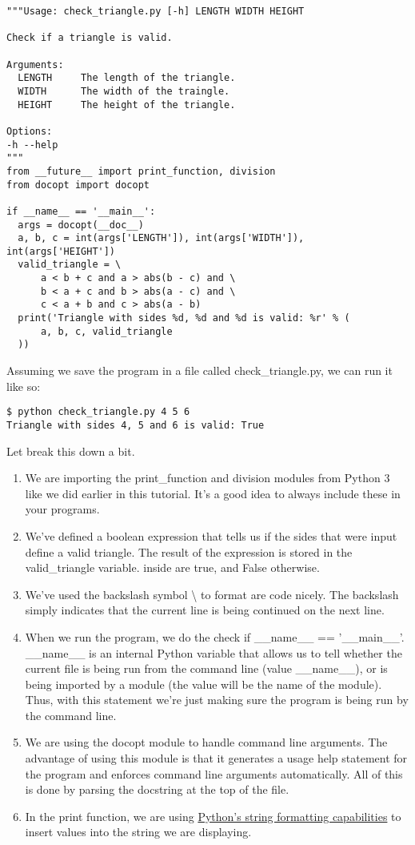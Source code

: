 \begin{verbatim}
"""Usage: check_triangle.py [-h] LENGTH WIDTH HEIGHT

Check if a triangle is valid.

Arguments:
  LENGTH     The length of the triangle.
  WIDTH      The width of the traingle.
  HEIGHT     The height of the triangle.

Options:
-h --help
"""
from __future__ import print_function, division
from docopt import docopt

if __name__ == '__main__':
  args = docopt(__doc__)
  a, b, c = int(args['LENGTH']), int(args['WIDTH']), int(args['HEIGHT'])
  valid_triangle = \
      a < b + c and a > abs(b - c) and \
      b < a + c and b > abs(a - c) and \
      c < a + b and c > abs(a - b)
  print('Triangle with sides %d, %d and %d is valid: %r' % (
      a, b, c, valid_triangle
  ))
\end{verbatim}

Assuming we save the program in a file called check\_triangle.py, we can
run it like so:

\begin{verbatim}
$ python check_triangle.py 4 5 6
Triangle with sides 4, 5 and 6 is valid: True
\end{verbatim}

Let break this down a bit.

\begin{enumerate}
\tightlist
\item
  We are importing the print\_function and division modules from Python
  3 like we did earlier in this tutorial. It's a good idea to always
  include these in your programs.
\item
  We've defined a boolean expression that tells us if the sides that
  were input define a valid triangle. The result of the expression is
  stored in the valid\_triangle variable. inside are true, and False
  otherwise.
\item
  We've used the backslash symbol \textbackslash{} to format are code
  nicely. The backslash simply indicates that the current line is being
  continued on the next line.
\item
  When we run the program, we do the check if \_\_name\_\_ ==
  '\_\_main\_\_'. \_\_name\_\_ is an internal Python variable that
  allows us to tell whether the current file is being run from the
  command line (value \_\_name\_\_), or is being imported by a module
  (the value will be the name of the module). Thus, with this statement
  we're just making sure the program is being run by the command line.
\item
  We are using the docopt module to handle command line arguments. The
  advantage of using this module is that it generates a usage help
  statement for the program and enforces command line arguments
  automatically. All of this is done by parsing the docstring at the top
  of the file.
\item
  In the print function, we are using
  \href{https://docs.python.org/2/library/string.html\#format-string-syntax}{Python's
  string formatting capabilities} to insert values into the string we
  are displaying.
\end{enumerate}

